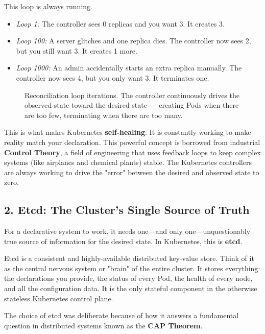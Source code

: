 This loop is always running.
\begin{itemize}
\item \textit{Loop 1:} The controller sees 0 replicas and you want 3. It creates 3.
\item \textit{Loop 100:} A server glitches and one replica dies. The controller now sees 2, but you still want 3. It creates 1 more.
\item \textit{Loop 1000:} An admin accidentally starts an extra replica manually. The controller now sees 4, but you only want 3. It terminates one.
\end{itemize}
\begin{figure}[htbp]
\centering

\caption{Reconciliation loop iterations. The controller continuously drives the observed state toward the desired state --- creating Pods when there are too few, terminating when there are too many.}
\label{fig:5_3}
\end{figure}



This is what makes Kubernetes \textbf{self-healing}. It is constantly working to make reality match your declaration. This powerful concept is borrowed from industrial \textbf{Control Theory}, a field of engineering that uses feedback loops to keep complex systems (like airplanes and chemical plants) stable. The Kubernetes controllers are always working to drive the "error" between the desired and observed state to zero.


\subsection{2. Etcd: The Cluster's Single Source of Truth}


For a declarative system to work, it needs one---and only one---unquestionably true source of information for the desired state. In Kubernetes, this is \textbf{etcd}.

Etcd is a consistent and highly-available distributed key-value store. Think of it as the central nervous system or "brain" of the entire cluster. It stores everything: the declarations you provide, the status of every Pod, the health of every node, and all the configuration data. It is the only stateful component in the otherwise stateless Kubernetes control plane.

The choice of etcd was deliberate because of how it answers a fundamental question in distributed systems known as the \textbf{CAP Theorem}.

